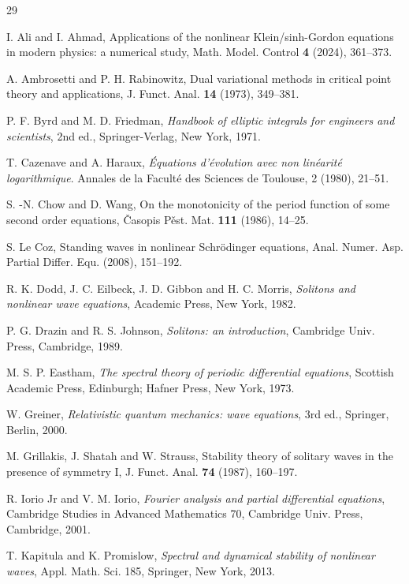 \documentclass[12pt,reqno,a4paper]{amsart} %
\numberwithin{equation}{section}
\numberwithin{figure}{section}
\begin{document}
\begin{thebibliography}{29}
	
I. Ali and I. Ahmad,
Applications of the nonlinear Klein/sinh-Gordon equations in modern physics: a numerical study,
Math. Model. Control \textbf{4} (2024), 361--373.

A. Ambrosetti and P. H. Rabinowitz,
Dual variational methods in critical point theory and applications,
J. Funct. Anal. \textbf{14} (1973), 349--381.

P. F. Byrd and M. D. Friedman,
\textit{Handbook of elliptic integrals for engineers and scientists},
2nd ed., Springer-Verlag, New York, 1971.

 T. Cazenave and A. Haraux, \textit{Équations d'évolution avec non linéarité logarithmique}. 
Annales de la Faculté des Sciences de Toulouse, 2 (1980), 21--51. 

S. -N. Chow and D. Wang,
On the monotonicity of the period function of some second order equations,
Časopis Pěst. Mat. \textbf{111} (1986), 14--25.

S. Le Coz,
Standing waves in nonlinear Schr\"odinger equations,
Anal. Numer. Asp. Partial Differ. Equ. (2008), 151--192.

R. K. Dodd, J. C. Eilbeck, J. D. Gibbon and H. C. Morris,
\textit{Solitons and nonlinear wave equations},
Academic Press, New York, 1982.

P. G. Drazin and R. S. Johnson,
\textit{Solitons: an introduction},
Cambridge Univ. Press, Cambridge, 1989.

M. S. P. Eastham,
\textit{The spectral theory of periodic differential equations},
Scottish Academic Press, Edinburgh; Hafner Press, New York, 1973.

W. Greiner,
\textit{Relativistic quantum mechanics: wave equations},
3rd ed., Springer, Berlin, 2000.

M. Grillakis, J. Shatah and W. Strauss,
Stability theory of solitary waves in the presence of symmetry I,
J. Funct. Anal. \textbf{74} (1987), 160--197.

R. Iorio Jr and V. M. Iorio,
\textit{Fourier analysis and partial differential equations},
Cambridge Studies in Advanced Mathematics 70,
Cambridge Univ. Press, Cambridge, 2001.

T. Kapitula and K. Promislow,
\textit{Spectral and dynamical stability of nonlinear waves},
Appl. Math. Sci. 185, Springer, New York, 2013.


\end{thebibliography}
\end{document}
